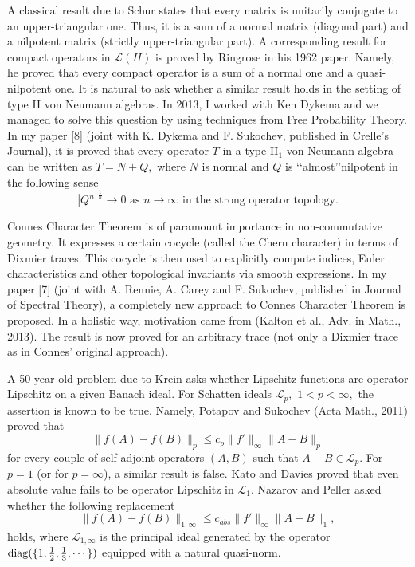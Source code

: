 \documentclass[12pt]{article}
\begin{document}
A classical result due to Schur states that every matrix is unitarily conjugate to an upper-triangular one. Thus, it is a sum of a normal matrix (diagonal part) and a nilpotent matrix (strictly upper-triangular part). A corresponding result for compact operators in $\mathcal{L}(H)$ is proved by Ringrose in his 1962 paper. Namely, he proved that every compact operator is a sum of a normal one and a quasi-nilpotent one. It is natural to ask whether a similar result holds in the setting of type II von Neumann algebras. In 2013, I worked with Ken Dykema and we managed to solve this question by using techniques from Free Probability Theory. In my paper [8] (joint with K. Dykema and F. Sukochev, published in Crelle's Journal), it is proved that every operator $T$ in a type II$_1$ von Neumann algebra can be written as $T=N+Q,$ where $N$ is normal and $Q$ is \lq\lq almost\rq\rq nilpotent in the following sense
$$|Q^n|^{\frac1n}\to0\mbox{ as }n\to\infty\mbox{ in the strong operator topology.}$$

Connes Character Theorem is of paramount importance in non-commutative geometry. It expresses a certain cocycle (called the Chern character) in terms of Dixmier traces. This cocycle is then used to explicitly compute indices, Euler characteristics and other topological invariants via smooth expressions. In my paper [7] (joint with A. Rennie, A. Carey and F. Sukochev, published in Journal of Spectral Theory), a completely new approach to Connes Character Theorem is proposed. In a holistic way, motivation came from (Kalton et al., Adv. in Math., 2013). The result is now proved for an arbitrary trace (not only a Dixmier trace as in Connes' original approach). 

A 50-year old problem due to Krein asks whether Lipschitz functions are operator Lipschitz on a given Banach ideal. For Schatten ideals $\mathcal{L}_p,$ $1<p<\infty,$ the assertion is known to be true. Namely, Potapov and Sukochev (Acta Math., 2011) proved that
$$\|f(A)-f(B)\|_p\leq c_p\|f'\|_{\infty}\|A-B\|_p$$
for every couple of self-adjoint operators $(A,B)$ such that $A-B\in\mathcal{L}_p.$ For $p=1$ (or for $p=\infty$), a similar result is false. Kato and Davies proved that even absolute value fails to be operator Lipschitz in $\mathcal{L}_1.$ Nazarov and Peller asked whether the following replacement
\begin{equation}\label{np conj}
\|f(A)-f(B)\|_{1,\infty}\leq c_{abs}\|f'\|_{\infty}\|A-B\|_1,
\end{equation}
holds, where $\mathcal{L}_{1,\infty}$ is the principal ideal generated by the operator ${\rm diag}(\{1,\frac12,\frac13,\cdots\})$ equipped with a natural quasi-norm. 
\end{document}
